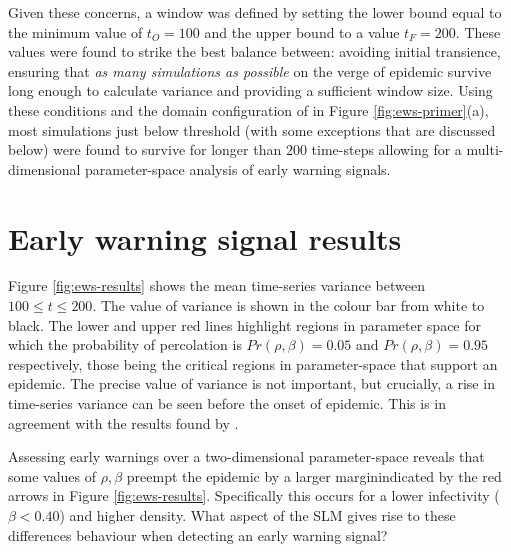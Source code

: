Given these concerns, a window was defined by setting the lower bound equal to the minimum %
value of $t_O=100$ and the upper bound to a value $t_F = 200$. %
These values were found to strike the best balance between: avoiding initial transience, %
ensuring that \textit{as many simulations as possible} on the verge of epidemic survive long %
enough to calculate variance and providing a sufficient window size. Using these conditions %
and the domain configuration of in Figure \ref{fig:ews-primer}(a), most simulations just below %
threshold (with some exceptions that are discussed below) were found to survive for longer %
than $200$ time-steps allowing for a multi-dimensional parameter-space analysis of early %
warning signals. %
 
\section{Early warning signal results}
\label{section:ews_slm}

Figure \ref{fig:ews-results} shows the mean time-series variance between $100\leq t \leq 200$. %
The value of variance is shown in the colour bar from white to black. %
The lower and upper red lines highlight regions in parameter space for which the %
probability of percolation is $Pr(\rho, \beta)=0.05$ and $Pr(\rho, \beta)=0.95$ respectively, %
those being the  critical regions in parameter-space that support an epidemic. %
The precise value of variance is not important, but crucially, a rise in time-series variance %
can be seen before the onset of epidemic. %
This is in agreement with the results found by \cite{OROZCOFUENTES201912}. %

Assessing early warnings over a two-dimensional parameter-space reveals that some values %
of $\rho, \beta$ preempt the epidemic by a larger margin\textemdash indicated by the red %
arrows in Figure \ref{fig:ews-results}. Specifically this occurs for a lower infectivity %
($\beta<0.40$) and higher density. What aspect of the SLM gives rise to these differences %
behaviour when detecting an early warning signal? %

